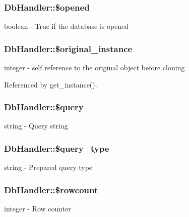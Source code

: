 \subsubsection[{\$opened}]{\setlength{\rightskip}{0pt plus 5cm}DbHandler::\$opened}\label{classDbHandler_a71e36ffbff0d157b1d91dc000bc6f821}
boolean -\/ True if the database is opened 
\subsubsection[{\$original\_\-instance}]{\setlength{\rightskip}{0pt plus 5cm}DbHandler::\$original\_\-instance}\label{classDbHandler_a495ca4030e7ca7d5e8c7e2604e042dfe}
integer -\/ self reference to the original object before cloning 

Referenced by get\_\-instance().

\subsubsection[{\$query}]{\setlength{\rightskip}{0pt plus 5cm}DbHandler::\$query}\label{classDbHandler_ad671b5596b37dac6d48a660a07775965}
string -\/ Query string 
\subsubsection[{\$query\_\-type}]{\setlength{\rightskip}{0pt plus 5cm}DbHandler::\$query\_\-type}\label{classDbHandler_afba491ae1a1f1b9343cb65c87ef1e2a9}
string -\/ Prepared query type 
\subsubsection[{\$rowcount}]{\setlength{\rightskip}{0pt plus 5cm}DbHandler::\$rowcount}\label{classDbHandler_a56a7ae4bd7d842c85f3fe8052aecbfef}
integer -\/ Row counter 
